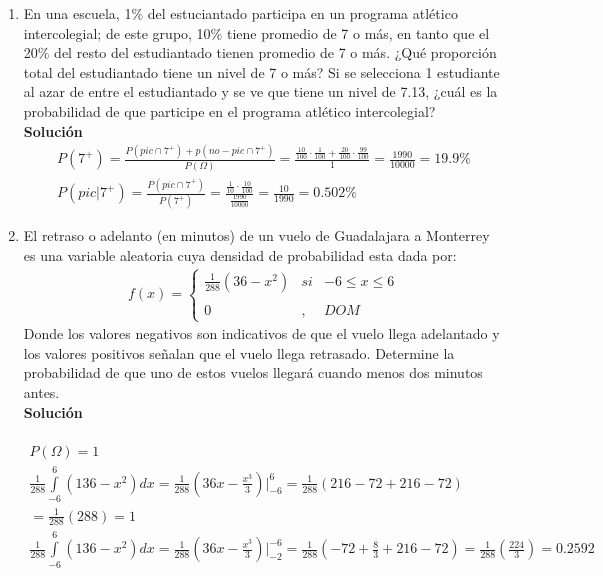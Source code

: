 \begin{enumerate}
    \item En una escuela, 1\% del estuciantado participa en un programa atlético intercolegial; de este grupo, 10\% tiene promedio de 7 o más, en tanto que el 20\% del resto del estudiantado tienen promedio de 7 o más. ¿Qué proporción total del estudiantado tiene un nivel de 7 o más? Si se selecciona 1 estudiante al azar de entre el estudiantado y se ve que tiene un nivel de 7.13, ¿cuál es la probabilidad de que participe en el programa atlético intercolegial?
    \\\textbf{Solución}
    \begin{gather*}
    P(7^+) = \frac{P(pic \cap 7^+) + p(no-pic \cap 7^+)}{P(\Omega)} = \frac{\frac{10}{100} \cdot \frac{1}{100} + \frac{20}{100} \cdot \frac{99}{100}}{1} = \frac{1990}{10000} = 19.9\% \\
    P(pic | 7^+) = \frac{P(pic \cap 7^+)}{P(7^+)} = \frac{\frac{1}{10} \cdot \frac{10}{100}}{\frac{1990}{10000}} = \frac{10}{1990} = 0.502\%
    \end{gather*}
    \item El retraso o adelanto (en minutos) de un vuelo de Guadalajara a Monterrey es una variable aleatoria cuya densidad de probabilidad esta dada por: \\
    \begin{align*}
    f(x)= \left\{ \begin{array}{lcc}
    \frac{1}{288}(36 - x^2) &   si  & -6 \leq x \leq 6 \\
    \\ 0 &  ,  & DOM
    \end{array}
    \right.
    \end{align*}
    Donde los valores negativos son indicativos de que el vuelo llega adelantado y los valores positivos señalan que el vuelo llega retrasado. Determine la probabilidad de que uno de estos vuelos llegará cuando menos dos minutos antes.
    \\\textbf{Solución}
    \\ \\
    \begin{gather*}
    P(\Omega) = 1 \\
    \frac{1}{288} \int \limits_{-6}^{6} (136-x^2) dx 
    = \frac{1}{288}(36x - \frac{x^3}{3})  \bigg\vert_{-6}^6 = \frac{1}{288}(216 - 72 + 216 - 72) \\		
    = \frac{1}{288}(288) = 1 \\
    \frac{1}{288} \int \limits_{-6}^{6} (136-x^2) dx 
    = \frac{1}{288}(36x - \frac{x^3}{3})  \bigg\vert_{-2}^{-6} = \frac{1}{288}(-72 + \frac{8}{3} + 216 - 72) = \frac{1}{288}(\frac{224}{3}) = 0.2592 \\
    \end{gather*}
    

\end{enumerate}
